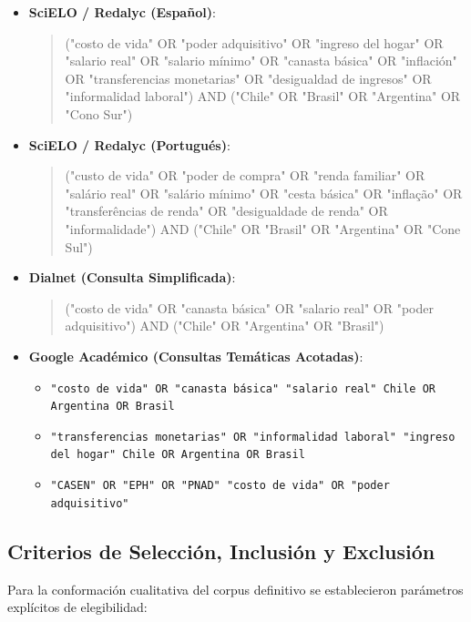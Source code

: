 \begin{itemize}
    \item \textbf{SciELO / Redalyc (Español)}:
    \begin{quote}
    \small\ttfamily\raggedright
    ("costo de vida" OR "poder adquisitivo" OR "ingreso del hogar" OR "salario real" OR "salario mínimo" OR "canasta básica" OR "inflación" OR "transferencias monetarias" OR "desigualdad de ingresos" OR "informalidad laboral") AND ("Chile" OR "Brasil" OR "Argentina" OR "Cono Sur")
    \end{quote}

    \item \textbf{SciELO / Redalyc (Portugués)}:
    \begin{quote}
    \small\ttfamily\raggedright
    ("custo de vida" OR "poder de compra" OR "renda familiar" OR "salário real" OR "salário mínimo" OR "cesta básica" OR "inflação" OR "transferências de renda" OR "desigualdade de renda" OR "informalidade") AND ("Chile" OR "Brasil" OR "Argentina" OR "Cone Sul")
    \end{quote}

    \item \textbf{Dialnet (Consulta Simplificada)}:
    \begin{quote}
    \small\ttfamily\raggedright
    ("costo de vida" OR "canasta básica" OR "salario real" OR "poder adquisitivo") AND ("Chile" OR "Argentina" OR "Brasil")
    \end{quote}

    \item \textbf{Google Académico (Consultas Temáticas Acotadas)}:
    \begin{itemize}
        \item \texttt{"costo de vida" OR "canasta básica" "salario real" Chile OR Argentina OR Brasil}
        \item \texttt{"transferencias monetarias" OR "informalidad laboral" "ingreso del hogar" Chile OR Argentina OR Brasil}
        \item \texttt{"CASEN" OR "EPH" OR "PNAD" "costo de vida" OR "poder adquisitivo"}
    \end{itemize}
\end{itemize}

\subsection{Criterios de Selección, Inclusión y Exclusión}
Para la conformación cualitativa del corpus definitivo se establecieron parámetros explícitos de elegibilidad:

